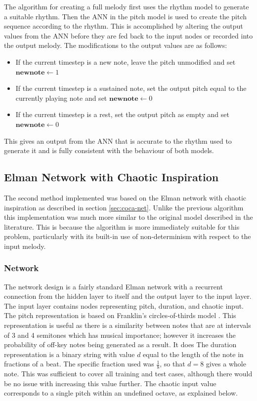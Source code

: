 \documentclass[ author={Stephen Livermore-Tozer},
				supervisor={Dr. Peter Flach},
				degree={MEng},
				title={Algorithmic Co-composition Using Machine Learning},
				subtitle={},
				type={research},
				year={2016} ]{dissertation}
\begin{document}
	The algorithm for creating a full melody first uses the rhythm model to generate a suitable rhythm. Then the ANN in the pitch model is used to create the pitch sequence according to the rhythm. This is accomplished by altering the output values from the ANN before they are fed back to the input nodes or recorded into the output melody. The modifications to the output values are as follows:
	\begin{itemize}
		\item If the current timestep is a new note, leave the pitch unmodified and set $\mathbf{new note} \leftarrow 1$
		\item If the current timestep is a sustained note, set the output pitch equal to the currently playing note and set $\mathbf{new note} \leftarrow 0$
		\item If the current timestep is a rest, set the output pitch as empty and set $\mathbf{new note} \leftarrow 0$
	\end{itemize}
	This gives an output from the ANN that is accurate to the rhythm used to generate it and is fully consistent with the behaviour of both models.
	
	\subsection{Elman Network with Chaotic Inspiration}
	\label{sec:elman-implementation}

	The second method implemented was based on the Elman network with chaotic inspiration as described in section \ref{sec:coca-net}. Unlike the previous algorithm this implementation was much more similar to the original model described in the literature. This is because the algorithm is more immediately suitable for this problem, particularly with its built-in use of non-determinism with respect to the input melody. 
	
	\subsubsection{Network}
	
	The network design is a fairly standard Elman network with a recurrent connection from the hidden layer to itself and the output layer to the input layer. The input layer contains nodes representing pitch, duration, and chaotic input. The pitch representation is based on Franklin's circles-of-thirds model \cite{franklin2006recurrent}. This representation is useful as there is a similarity between notes that are at intervals of 3 and 4 semitones which has musical importance; however it increases the probability of off-key notes being generated as a result. It does The duration representation is a binary string with value $d$ equal to the length of the note in fractions of a beat. The specific fraction used was $\frac{1}{8}$, so that $d = 8$ gives a whole note. This was sufficient to cover all training and test cases, although there would be no issue with increasing this value further. The chaotic input value corresponds to a single pitch within an undefined octave, as explained below.
	
\end{document}
